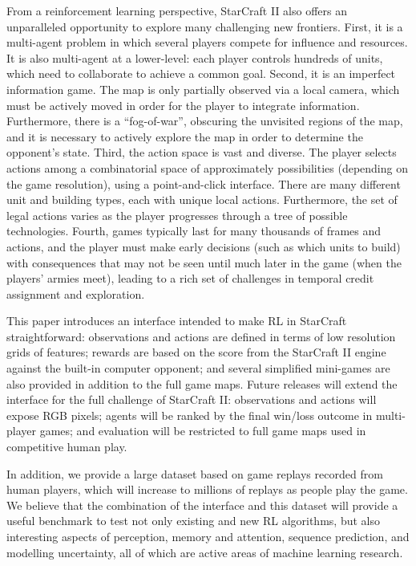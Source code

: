 \documentclass{article}
\begin{document}
From a reinforcement learning perspective, StarCraft II also offers an unparalleled opportunity to explore many challenging new frontiers. First, it is a multi-agent problem in which several players compete for influence and resources. It is also multi-agent at a lower-level: each player controls hundreds of units, which need to collaborate to achieve a common goal. Second, it is an imperfect information game. The map is only partially observed via a local camera, which must be actively moved in order for the player to integrate information. Furthermore, there is a ``fog-of-war'', obscuring the unvisited regions of the map, and it is necessary to actively explore the map in order to determine the opponent's state. Third, the action space is vast and diverse. The player selects actions among a combinatorial space of approximately  possibilities (depending on the game resolution), using a point-and-click interface. There are many different unit and building types, each with unique local actions. Furthermore, the set of legal actions varies as the player progresses through a tree of possible technologies. Fourth, games typically last for many thousands of frames and actions, and the player must make early decisions (such as which units to build) with consequences that may not be seen until much later in the game (when the players' armies meet), leading to a rich set of challenges in temporal credit assignment and exploration.

This paper introduces an interface intended to make RL in StarCraft straightforward: observations and actions are defined in terms of low resolution grids of features; rewards are based on the score from the StarCraft II engine against the built-in computer opponent; and several simplified mini-games are also provided in addition to the full game maps. Future releases will extend the interface for the full challenge of StarCraft II: observations and actions will expose RGB pixels; agents will be ranked by the final win/loss outcome in multi-player games; and evaluation will be restricted to full game maps used in competitive human play.


In addition, we provide a large dataset based on game replays recorded from human players, which will increase to millions of replays as people play the game. We believe that the combination of the interface and this dataset will provide a useful benchmark to test not only existing and new RL algorithms, but also interesting aspects of perception, memory and attention, sequence prediction, and modelling uncertainty, all of which are active areas of machine learning research.
\end{document}
